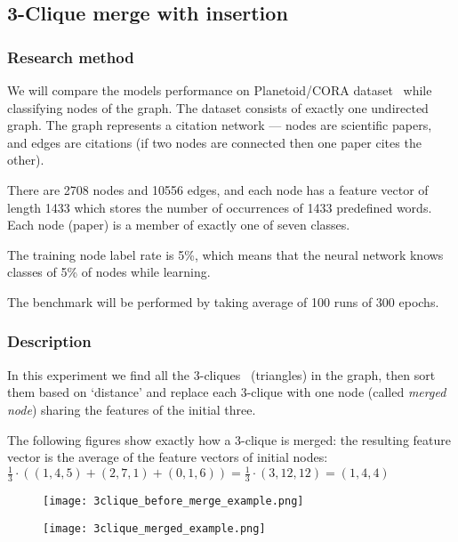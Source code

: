 \newcommand\abs[1]{\ensuremath{\lvert #1 \rvert}}

\subsection{3-Clique merge with insertion}

\subsubsection*{Research method}

We will compare the models performance on Planetoid/CORA dataset~\cite{cora_dataset} while classifying nodes of the graph.
The dataset consists of exactly one undirected graph.
The graph represents a citation network --- nodes are scientific papers, and edges are citations (if two nodes are connected then one paper cites the other).

There are 2708 nodes and 10556 edges, and each node has a feature vector of length 1433 which stores the number of occurrences of 1433 predefined words.
Each node (paper) is a member of exactly one of seven classes.

The training node label rate is 5\%, which means that the neural network knows classes of 5\% of nodes while learning.

The benchmark will be performed by taking average of 100 runs of 300 epochs.

\subsubsection*{Description}

In this experiment we find all the 3-cliques~\cite{wiki_clique} (triangles) in the graph, then sort them based on `distance' and replace each 3-clique with one node (called \emph{merged node}) sharing the features of the initial three.

The following figures show exactly how a 3-clique is merged: the resulting feature vector is the average of the feature vectors of initial nodes: $\frac{1}{3} \cdot \left( (1, 4, 5) + (2, 7, 1) + (0, 1, 6) \right) = \frac{1}{3} \cdot (3, 12, 12) = (1, 4, 4)$

\begin{multicols}{2}
	\begin{figure}
		\centering
		\texttt{[image: 3clique\_before\_merge\_example.png]}
	\end{figure}

	\begin{figure}
		\centering
		\texttt{[image: 3clique\_merged\_example.png]}
	\end{figure}
\end{multicols}

